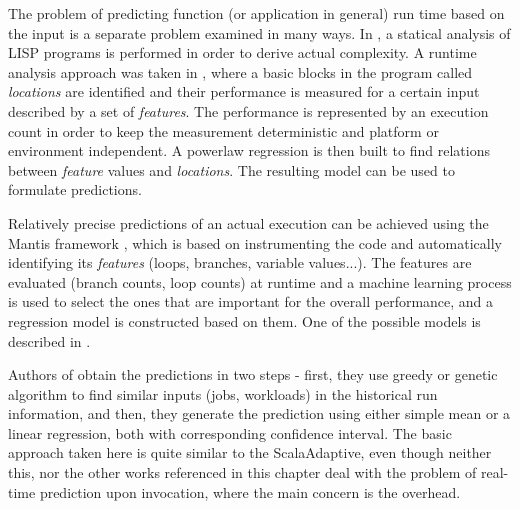 The problem of predicting function (or application in general) run time based on the input is a separate problem examined in many ways. In \cite{wegbreit_mechanical_1975}, a statical analysis of LISP programs is performed in order to derive actual complexity. A runtime analysis approach was taken in \cite{goldsmith_measuring_2007}, where a basic blocks in the program called \textit{locations} are identified and their performance is measured for a certain input described by a set of \textit{features}. The performance is represented by an execution count in order to keep the measurement deterministic and platform or environment independent. A powerlaw regression is then built to find relations between \textit{feature} values and \textit{locations}. The resulting model can be used to formulate predictions.

Relatively precise predictions of an actual execution can be achieved using the Mantis framework \cite{chun_mantis:_2010}, which is based on instrumenting the code and automatically identifying its \textit{features} (loops, branches, variable values...). The features are evaluated (branch counts, loop counts) at runtime and a machine learning process is used to select the ones that are important for the overall performance, and a regression model is constructed based on them. One of the possible models is described in \cite{huang_predicting_2010}.

Authors of \cite{smith_predicting_1998} obtain the predictions in two steps - first, they use greedy or genetic algorithm to find similar inputs (jobs, workloads) in the historical run information, and then, they generate the prediction using either simple mean or a linear regression, both with corresponding confidence interval. The basic approach taken here is quite similar to the ScalaAdaptive, even though neither this, nor the other works referenced in this chapter deal with the problem of real-time prediction upon invocation, where the main concern is the overhead.